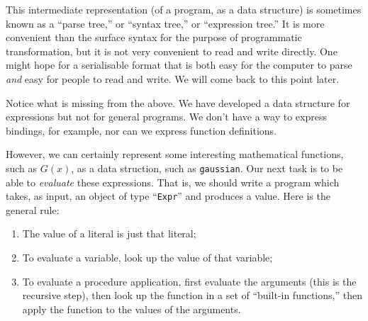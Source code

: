 \documentclass[11pt, a4paper]{article}
\newcommand{\cd}[1]{\texttt{#1}}
\begin{document}
This intermediate representation (of a program, as a data structure)
is sometimes known as a ``parse tree,'' or ``syntax tree,'' or
``expression tree.'' It is more convenient than the surface syntax for
the purpose of programmatic transformation, but it is not very
convenient to read and write directly. One might hope for a
serialisable format that is both easy for the computer to parse
\emph{and} easy for people to read and write. We will come back to
this point later.

Notice what is missing from the above. We have developed a data
structure for expressions but not for general programs. We don't have
a way to express bindings, for example, nor can we express function
definitions.

However, we can certainly represent some interesting mathematical
functions, such as $G(x)$, as a data struction, such as
\cd{gaussian}. Our next task is to be able to \emph{evaluate} these
expressions. That is, we should write a program which takes, as input,
an object of type ``\cd{Expr}'' and produces a value. Here is the
general rule:
\begin{enumerate}
\item The value of a literal is just that literal;
\item To evaluate a variable, look up the value of that variable;
\item To evaluate a procedure application, first evaluate the
  arguments (this is the recursive step), then look up the function
  in a set of ``built-in functions,'' then apply the function to the
  values of the arguments.
\end{enumerate}
\end{document}
